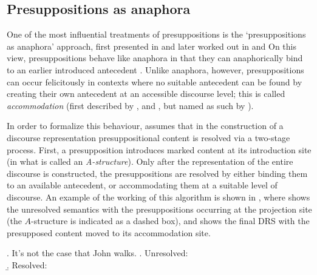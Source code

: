 

\subsection{Presuppositions as anaphora}

One of the most influential treatments of presuppositions is the
`presuppositions as anaphora' approach, first presented in
\citet{sandt1989presupposition} and later worked out in
\citet{sandt1992presupposition} and \citet{geurts1999presuppositions} On
this view, presuppositions behave like anaphora in that they can
anaphorically bind to an earlier introduced antecedent \citep[see
also][]{soames1979projection,kripke2009presupposition}.  Unlike anaphora,
however, presuppositions can occur felicitously in contexts where no
suitable antecedent can be found by creating their own antecedent at an
accessible discourse level; this is called \emph{accommodation} (first
described by \citealp{karttunen1974presupposition}, and
\citealp{stalnaker1974pragmatic}, but named as such by
\citealp{lewis1979scorekeeping}).


In order to formalize this behaviour, \citet{sandt1992presupposition}
assumes that in the construction of a discourse representation
presuppositional content is resolved via a two-stage process. First,
a presupposition introduces marked content at its introduction site (in what
is called an \emph{A-structure}). Only after the representation of the
entire discourse is constructed, the presuppositions are resolved by either
binding them to an available antecedent, or accommodating them at a suitable
level of discourse. An example of the working of this algorithm is shown in
\Next, where \Next[a] shows the unresolved semantics with the
presuppositions occurring at the projection site (the $A$-structure is
indicated as a dashed box), and \Next[b] shows the final DRS with the
presupposed content moved to its accommodation site.  

\begin{multicols}{2}
\ex. It's not the case that John walks.
\a. Unresolved:\\
  \columnbreak
  \b. \vspace*{0.4cm} Resolved:\\

\end{multicols}

